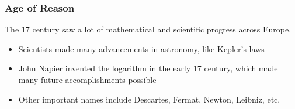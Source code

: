 \documentclass[class=article, crop=false]{standalone}
\begin{document}
  \subsubsection{Age of Reason}
  The 17 century saw a lot of mathematical and scientific progress across Europe.
  \begin{itemize}
    \item Scientists made many advancements in astronomy, like Kepler's laws
    \item John Napier invented the logarithm in the early 17 century, which made many future accomplishments possible
    \item Other important names include Descartes, Fermat, Newton, Leibniz, etc.
  \end{itemize}
\end{document}
